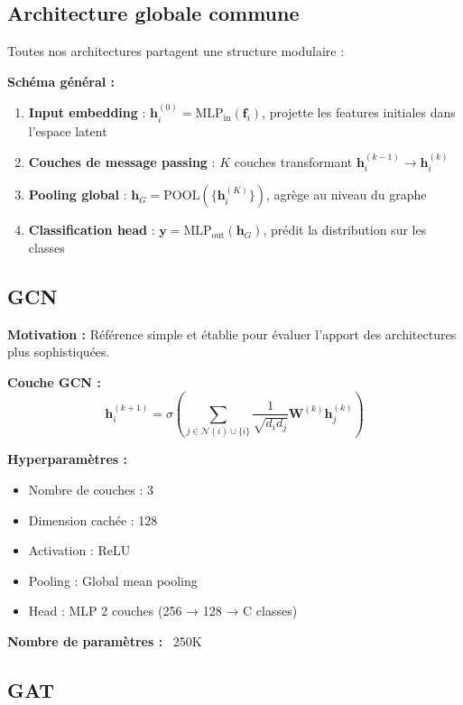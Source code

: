 \subsection{Architecture globale commune}

Toutes nos architectures partagent une structure modulaire :

\textbf{Schéma général :}
\begin{enumerate}
    \item \textbf{Input embedding} : $\mathbf{h}_i^{(0)} = \text{MLP}_{\text{in}}(\mathbf{f}_i)$, projette les features initiales dans l'espace latent
    \item \textbf{Couches de message passing} : $K$ couches transformant $\mathbf{h}_i^{(k-1)} \rightarrow \mathbf{h}_i^{(k)}$
    \item \textbf{Pooling global} : $\mathbf{h}_G = \text{POOL}(\{\mathbf{h}_i^{(K)}\})$, agrège au niveau du graphe
    \item \textbf{Classification head} : $\mathbf{y} = \text{MLP}_{\text{out}}(\mathbf{h}_G)$, prédit la distribution sur les classes
\end{enumerate}

\subsection{GCN}

\textbf{Motivation :}
Référence simple et établie pour évaluer l'apport des architectures plus sophistiquées.

\textbf{Couche GCN :}
\[
\mathbf{h}_i^{(k+1)} = \sigma\left(\sum_{j \in \mathcal{N}(i) \cup \{i\}} \frac{1}{\sqrt{d_i d_j}} \mathbf{W}^{(k)}\mathbf{h}_j^{(k)}\right)
\]

\textbf{Hyperparamètres :}
\begin{itemize}
    \item Nombre de couches : 3
    \item Dimension cachée : 128
    \item Activation : ReLU
    \item Pooling : Global mean pooling
    \item Head : MLP 2 couches (256 → 128 → C classes)
\end{itemize}

\textbf{Nombre de paramètres :} ~250K

\subsection{GAT}

